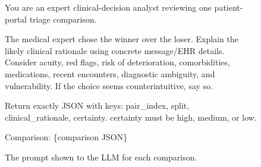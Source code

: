 \documentclass{article}
\begin{document}
\begin{figure}[hbt!]
    \centering
\begin{tcolorbox}[
    colback=gray!5!white,
    colframe=gray!50!black,
    title=\textbf{Stage 1: Per-Comparison Reasoning Prompt},
    arc=0pt,
    boxrule=0.5pt,
    fontupper=\small\sffamily
]
You are an expert clinical-decision analyst reviewing one patient-portal triage comparison.

The medical expert chose the winner over the loser. Explain the likely clinical rationale using concrete message/EHR details. Consider acuity, red flags, risk of deterioration, comorbidities, medications, recent encounters, diagnostic ambiguity, and vulnerability. If the choice seems counterintuitive, say so.

Return exactly JSON with keys: pair\_index, split, clinical\_rationale, certainty. certainty must be high, medium, or low.

Comparison: \{comparison JSON\}
\end{tcolorbox}
\caption{The prompt shown to the LLM for each comparison.}
    \label{fig:comparison_reasoning_prompt}
\end{figure}
\end{document}
